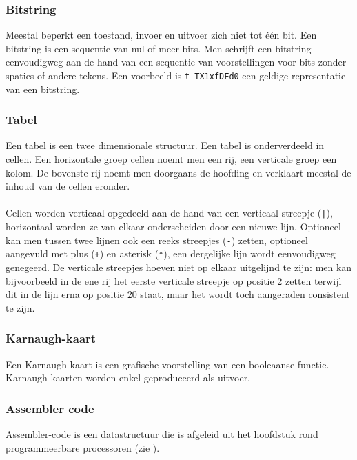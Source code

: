 \subsubsection{Bitstring}
Meestal beperkt een toestand, invoer en uitvoer zich niet tot \'e\'en bit. Een bitstring is een sequentie van nul of meer bits. Men schrijft een bitstring eenvoudigweg aan de hand van een sequentie van voorstellingen voor bits zonder spaties of andere tekens. Een voorbeeld is \texttt{t-TX1xfDFd0} een geldige representatie van een bitstring.
\subsubsection{Tabel}
Een tabel is een twee dimensionale structuur. Een tabel is onderverdeeld in cellen. Een horizontale groep cellen noemt men een rij, een verticale groep een kolom. De bovenste rij noemt men doorgaans de hoofding en verklaart meestal de inhoud van de cellen eronder.
\paragraph{}
Cellen worden verticaal opgedeeld aan de hand van een verticaal streepje (\texttt{|}), horizontaal worden ze van elkaar onderscheiden door een nieuwe lijn. Optioneel kan men tussen twee lijnen ook een reeks streepjes (\texttt{-}) zetten, optioneel aangevuld met plus (\texttt{+}) en asterisk (\texttt{*}), een dergelijke lijn wordt eenvoudigweg genegeerd. De verticale streepjes hoeven niet op elkaar uitgelijnd te zijn: men kan bijvoorbeeld in de ene rij het eerste verticale streepje op positie $2$ zetten terwijl dit in de lijn erna op positie $20$ staat, maar het wordt toch aangeraden consistent te zijn.%
\subsubsection{Karnaugh-kaart}
Een Karnaugh-kaart is een grafische voorstelling van een booleaanse-functie. Karnaugh-kaarten worden enkel geproduceerd als uitvoer.
\subsubsection{Assembler code}
Assembler-code is een datastructuur die is afgeleid uit het hoofdstuk rond programmeerbare processoren (zie ).
